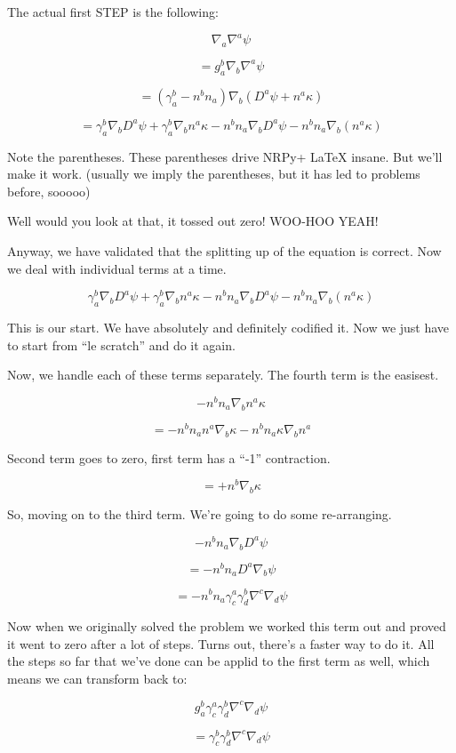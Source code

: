 \documentclass[landscape,letterpaper,10pt,english]{article}
\begin{document}
    The actual first STEP is the following:

\[\nabla_a \nabla^a \psi\]

\[ = g^b_a \nabla_b \nabla^a \psi \]

\[ = (\gamma^b_a - n^bn_a) \nabla_b (D^a \psi + n^a \kappa) \]

\[ = \gamma^b_a\nabla_b D^a \psi + \gamma^b_a \nabla_b n^a \kappa -n^bn_a \nabla_b D^a \psi - n^bn_a \nabla_b (n^a \kappa) \]

Note the parentheses. These parentheses drive NRPy+ LaTeX insane. But
we'll make it work. (usually we imply the parentheses, but it has led to
problems before, sooooo)

    Well would you look at that, it tossed out zero! WOO-HOO YEAH!

Anyway, we have validated that the splitting up of the equation is
correct. Now we deal with individual terms at a time.

\[ \gamma^b_a\nabla_b D^a \psi + \gamma^b_a \nabla_b n^a \kappa -n^bn_a \nabla_b D^a \psi - n^bn_a \nabla_b (n^a \kappa) \]

This is our start. We have absolutely and definitely codified it. Now we
just have to start from ``le scratch'' and do it again.

    Now, we handle each of these terms separately. The fourth term is the
easisest.

\[ -n^bn_a \nabla_b n^a \kappa \]

\[ = -n^bn_a n^a \nabla_b \kappa -n^bn_a \kappa \nabla_b n^a \]

Second term goes to zero, first term has a ``-1'' contraction.

\[ = + n^b \nabla_b \kappa \]

So, moving on to the third term. We're going to do some re-arranging.

\[ -n^bn_a \nabla_b D^a \psi \]

\[ = -n^bn_a D^a \nabla_b \psi \]

\[ = -n^bn_a \gamma^a_c \gamma_d^b \nabla^c \nabla_d \psi \]

Now when we originally solved the problem we worked this term out and
proved it went to zero after a lot of steps. Turns out, there's a faster
way to do it. All the steps so far that we've done can be applid to the
first term as well, which means we can transform back to:

\[ g^b_a \gamma^a_c \gamma_d^b \nabla^c \nabla_d \psi \]

\[ = \gamma^b_c \gamma_d^b \nabla^c \nabla_d \psi \]
\end{document}
